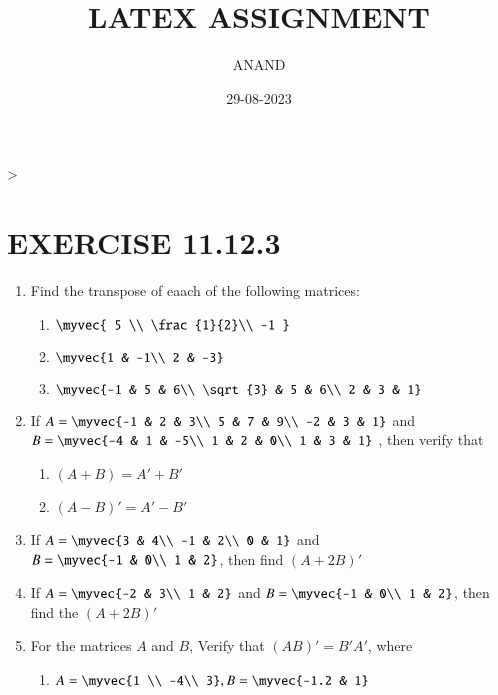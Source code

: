 \documentclass{article}
\theoremstyle{remark}
\begin{document}
\title{LATEX ASSIGNMENT}
\author{ANAND}
\date{29-08-2023}
\maketitle                                                                       >
\section*{EXERCISE 11.12.3}
\begin{enumerate}
\item Find the transpose of eaach of the following matrices:
\begin{enumerate}[label=(\roman*)]
\item $\myvec{ 5 \\ \frac{1}{2}\\ -1 }$
\item $\myvec {1 & -1\\ 2 & -3}$
\item $\myvec{-1 & 5 & 6\\ \sqrt{3} & 5 & 6\\ 2 & 3 & 1}$
\end{enumerate}
\item If $A=\myvec {-1 & 2 & 3\\ 5 & 7 & 9\\ -2 & 3 & 1}$ and $B= \myvec{-4 & 1 & -5\\ 1 & 2 & 0\\ 1 & 3 & 1}$
, then verify that
\begin{enumerate}
\item $(A+B)=A'+B'$
\item $(A-B)'=A'-B'$
\end{enumerate}
\item If $A=\myvec{3 & 4\\ -1 & 2\\ 0 & 1}$ and $B=\myvec{-1 & 0\\ 1 & 2}$, then find $(A+2B)'$
\item If $A=\myvec{-2 & 3\\ 1 & 2}$ and $B=\myvec{-1 & 0\\ 1 & 2} $, then find the $(A+2B)'$
\item For the matrices $A$ and $B$, Verify that $(AB)'= B'A'$, where 
\begin{enumerate}[label=(\roman*)]
\item $A=\myvec {1 \\ -4\\  3} , B=\myvec {-1.2 & 1}$

\end{enumerate}
\end{enumerate}
\end{document}
